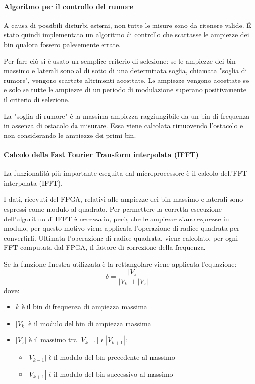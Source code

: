 \paragraph{Algoritmo per il controllo del rumore}
A causa di possibili disturbi esterni, non tutte le misure sono da ritenere valide. \'E stato quindi implementato un algoritmo di controllo che scartasse le ampiezze dei bin qualora fossero palesemente errate.

Per fare ciò si è usato un semplice criterio di selezione: se le ampiezze dei bin massimo e laterali sono al di sotto di una determinata soglia, chiamata "soglia di rumore", vengono scartate altrimenti accettate. Le ampiezze vengono accettate se e solo se tutte le ampiezze di un periodo di modulazione superano positivamente il criterio di selezione.

La "soglia di rumore" è la massima ampiezza raggiungibile da un bin di frequenza in assenza di ostacolo da misurare. Essa viene calcolata rimuovendo l'ostacolo e non considerando le ampiezze dei primi bin.

\paragraph{Calcolo della Fast Fourier Transform interpolata (IFFT)}
La funzionalità più importante eseguita dal microprocessore è il calcolo dell'FFT interpolata (IFFT). 

I dati, ricevuti del FPGA, relativi alle ampiezze dei bin massimo e laterali sono espressi come modulo al quadrato. Per permettere la corretta esecuzione dell'algoritmo di IFFT è necessario, però, che le ampiezze siano espresse in modulo, per questo motivo viene applicata l'operazione di radice quadrata per convertirli.
Ultimata l'operazione di radice quadrata, viene calcolato, per ogni FFT computata dal FPGA, il fattore di correzione della frequenza.

Se la funzione finestra utilizzata è la rettangolare viene applicata l'equazione:
\begin{equation}
	\delta = \frac{|V_{x}|}{|V_{k}|+|V_{x}|}
\end{equation}
dove:
\begin{itemize}
	\item $k$ è il bin di frequenza di ampiezza massima
	\item $|V_k|$ è il modulo del bin di ampiezza massima
	\item $|V_x|$ è il massimo tra $|V_{k-1}|$ e $|V_{k+1}|$:
	\begin{itemize}
	\item $|V_{k-1}|$ è il modulo del bin precedente al massimo
	\item $|V_{k+1}|$ è il modulo del bin successivo al massimo
	\end{itemize} 
\end{itemize}

